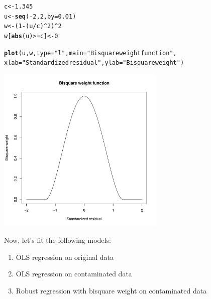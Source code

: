 \documentclass{article}\usepackage[]{graphicx}\usepackage[]{color}
\makeatletter
\newcommand{\hlnum}[1]{\textcolor[rgb]{0.686,0.059,0.569}{#1}}%
\newcommand{\hlstr}[1]{\textcolor[rgb]{0.192,0.494,0.8}{#1}}%
\newcommand{\hlopt}[1]{\textcolor[rgb]{0,0,0}{#1}}%
\newcommand{\hlstd}[1]{\textcolor[rgb]{0.345,0.345,0.345}{#1}}%
\newcommand{\hlkwb}[1]{\textcolor[rgb]{0.69,0.353,0.396}{#1}}%
\newcommand{\hlkwc}[1]{\textcolor[rgb]{0.333,0.667,0.333}{#1}}%
\newcommand{\hlkwd}[1]{\textcolor[rgb]{0.737,0.353,0.396}{\textbf{#1}}}%
\newenvironment{kframe}{%
 \def\at@end@of@kframe{}%
 \ifinner\ifhmode%
  \def\at@end@of@kframe{\end{minipage}}%
  \begin{minipage}{\columnwidth}%
 \fi\fi%
 \def\FrameCommand##1{\hskip\@totalleftmargin \hskip-\fboxsep
 \colorbox{shadecolor}{##1}\hskip-\fboxsep
     \hskip-\linewidth \hskip-\@totalleftmargin \hskip\columnwidth}%
 \MakeFramed {\advance\hsize-\width
   \@totalleftmargin\z@ \linewidth\hsize
   \@setminipage}}%
 {\par\unskip\endMakeFramed%
 \at@end@of@kframe}
\newenvironment{knitrout}{}{} %
\makeatother
\begin{document}
\begin{knitrout}
\color{fgcolor}\begin{kframe}
\begin{alltt}
\hlstd{c} \hlkwb{<-} \hlnum{1.345}
\hlstd{u} \hlkwb{<-} \hlkwd{seq}\hlstd{(}\hlopt{-}\hlnum{2}\hlstd{,} \hlnum{2}\hlstd{,} \hlkwc{by} \hlstd{=} \hlnum{0.01}\hlstd{)}
\hlstd{w} \hlkwb{<-} \hlstd{(}\hlnum{1} \hlopt{-} \hlstd{(u}\hlopt{/}\hlstd{c)}\hlopt{^}\hlnum{2}\hlstd{)}\hlopt{^}\hlnum{2}
\hlstd{w[}\hlkwd{abs}\hlstd{(u)} \hlopt{>=} \hlstd{c]} \hlkwb{<-} \hlnum{0}

\hlkwd{plot}\hlstd{(u, w,} \hlkwc{type} \hlstd{=} \hlstr{"l"}\hlstd{,} \hlkwc{main} \hlstd{=} \hlstr{"Bisquare weight function"}\hlstd{,}
     \hlkwc{xlab} \hlstd{=} \hlstr{"Standardized residual"}\hlstd{,} \hlkwc{ylab} \hlstd{=} \hlstr{"Bisquare weight"}\hlstd{)}
\end{alltt}
\end{kframe}

{\centering \includegraphics[width=0.6\textwidth]{figure/unnamed-chunk-9-1} 

}



\end{knitrout}

Now, let's fit the following models:
\begin{enumerate}
  \item OLS regression on original data
  \item OLS regression on contaminated data
  \item Robust regression with bisquare weight on contaminated data
\end{enumerate}
\end{document}
